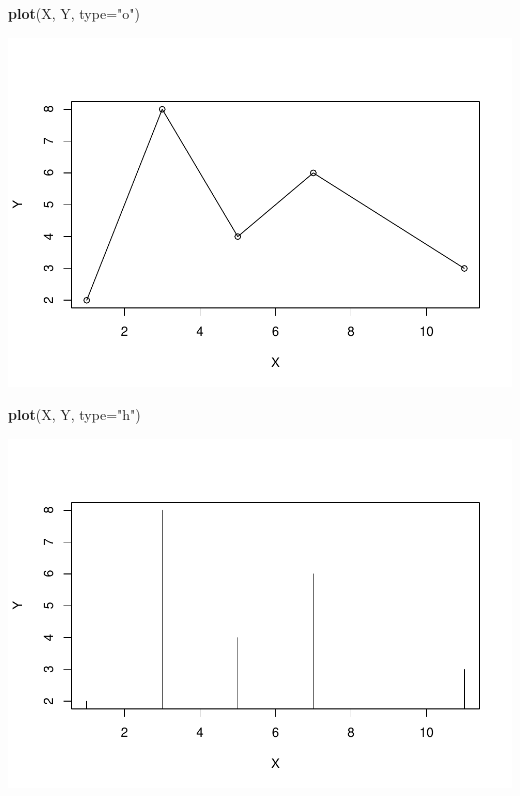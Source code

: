 \documentclass[
]{book}
\newenvironment{Shaded}{\begin{snugshade}}{\end{snugshade}}
\newcommand{\DataTypeTok}[1]{\textcolor[rgb]{0.13,0.29,0.53}{#1}}
\newcommand{\KeywordTok}[1]{\textcolor[rgb]{0.13,0.29,0.53}{\textbf{#1}}}
\newcommand{\NormalTok}[1]{#1}
\newcommand{\StringTok}[1]{\textcolor[rgb]{0.31,0.60,0.02}{#1}}
\theoremstyle{definition}
\theoremstyle{definition}
\theoremstyle{definition}
\theoremstyle{remark}
\begin{document}
\begin{Shaded}
\begin{Highlighting}[]
\KeywordTok{plot}\NormalTok{(X, Y, }\DataTypeTok{type=}\StringTok{"o"}\NormalTok{)}
\end{Highlighting}
\end{Shaded}

\begin{center}\includegraphics[width=0.9\linewidth]{07chap06_Graficos_I_files/figure-latex/unnamed-chunk-8-1} \end{center}

\begin{Shaded}
\begin{Highlighting}[]
\KeywordTok{plot}\NormalTok{(X, Y, }\DataTypeTok{type=}\StringTok{"h"}\NormalTok{)}
\end{Highlighting}
\end{Shaded}

\begin{center}\includegraphics[width=0.9\linewidth]{07chap06_Graficos_I_files/figure-latex/unnamed-chunk-9-1} \end{center}
\end{document}

